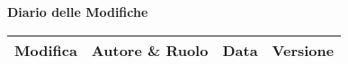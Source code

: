 \begin{center}
\begin{small}
	\vspace*{0.5cm}
	\thispagestyle{empty}
	\textbf{\huge Diario delle Modifiche}
	\vspace{0.5cm}
	\begin{longtable}{p{6cm}|c|c|c}
		\label{tab:history}
		\textbf{Modifica} & \textbf{Autore \& Ruolo} & \textbf{Data} & \textbf{Versione} \\
		\hline
		\hline
		

\end{longtable}
\end{small}
\end{center}
